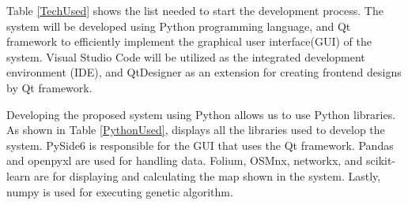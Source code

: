 	Table \ref{TechUsed} shows the list needed to start the development process. The system will be developed using Python programming language, and Qt framework to efficiently implement the graphical user interface(GUI) of the system. Visual Studio Code will be utilized as the integrated development environment (IDE), and QtDesigner as an extension for creating frontend designs by Qt framework.
	
	\begin{table}[h]
		\centering
		\caption{List of tools and technologies used in the development process}
		\label{TechUsed}
	\end{table}
	
	Developing the proposed system using Python allows us to use Python libraries. As shown in Table \ref{PythonUsed}, displays all the libraries used to develop the system. PySide6 is responsible for the GUI that uses the Qt framework. Pandas and openpyxl are used for handling data. Folium, OSMnx, networkx, and scikit-learn are for displaying and calculating the map shown in the system. Lastly, numpy is used for executing genetic algorithm.
	
